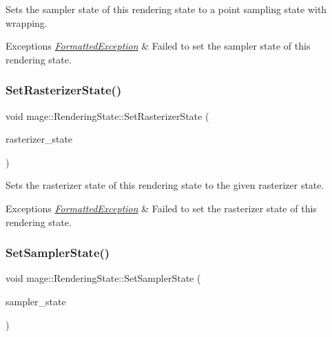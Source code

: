 Sets the sampler state of this rendering state to a point sampling state with wrapping.


\begin{DoxyExceptions}{Exceptions}
{\em \hyperlink{structmage_1_1_formatted_exception}{Formatted\+Exception}} & Failed to set the sampler state of this rendering state. \\
\hline
\end{DoxyExceptions}
\hypertarget{structmage_1_1_rendering_state_a067596b397a607f5016b2f8ef9e7dd2e}{}\label{structmage_1_1_rendering_state_a067596b397a607f5016b2f8ef9e7dd2e} 
\subsubsection{\texorpdfstring{Set\+Rasterizer\+State()}{SetRasterizerState()}}
{\footnotesize\ttfamily void mage\+::\+Rendering\+State\+::\+Set\+Rasterizer\+State (\begin{DoxyParamCaption}\item[{I\+D3\+D11\+Rasterizer\+State $\ast$}]{rasterizer\+\_\+state }\end{DoxyParamCaption})}

Sets the rasterizer state of this rendering state to the given rasterizer state.


\begin{DoxyExceptions}{Exceptions}
{\em \hyperlink{structmage_1_1_formatted_exception}{Formatted\+Exception}} & Failed to set the rasterizer state of this rendering state. \\
\hline
\end{DoxyExceptions}
\hypertarget{structmage_1_1_rendering_state_ab0c8450e46a9172871e5a40f2303bfb2}{}\label{structmage_1_1_rendering_state_ab0c8450e46a9172871e5a40f2303bfb2} 
\subsubsection{\texorpdfstring{Set\+Sampler\+State()}{SetSamplerState()}}
{\footnotesize\ttfamily void mage\+::\+Rendering\+State\+::\+Set\+Sampler\+State (\begin{DoxyParamCaption}\item[{I\+D3\+D11\+Sampler\+State $\ast$}]{sampler\+\_\+state }\end{DoxyParamCaption})}


